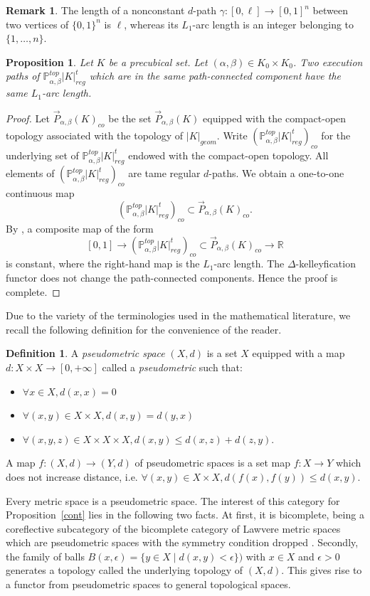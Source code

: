 \documentclass[a4paper,12pt]{amsart}
\newcommand{\p}{\times}
\renewcommand{\vec}{\overrightarrow}
\renewcommand{\P}{\mathbb{P}}
\newtheorem{prop}[thm]{Proposition}
\newcommand{\bp}{\begin{prop}}
\newcommand{\ep}{\end{prop}}
\newcommand{\bpf}{\begin{proof}}
\newcommand{\epf}{\end{proof}}
\theoremstyle{definition}
\newtheorem{defn}[thm]{Definition}
\newtheorem{rem}[thm]{Remark}
\newcommand{\bd}{\begin{defn}}
\newcommand{\ed}{\end{defn}}
\renewcommand{\leq}{\leqslant}
\renewcommand{\P}{\mathbb{P}}
\begin{document}
\begin{rem}
	The length of a nonconstant $d$-path $\gamma:[0,\ell]\to [0,1]^n$ between two vertices of $\{0,1\}^n$ is $\ell$, whereas its $L_1$-arc length is an integer belonging to $\{1,\dots,n\}$.
\end{rem} 

\bp \label{same-length}
Let $K$ be a precubical set. Let $(\alpha,\beta)\in K_0\p K_0$. Two execution paths of $\P^{top}_{\alpha,\beta}|K|^t_{reg}$ which are in the same path-connected component have the same $L_1$-arc length. 
\ep

\bpf
Let $\vec{P}_{\alpha,\beta}(K)_{co}$ be the set $\vec{P}_{\alpha,\beta}(K)$ equipped with the compact-open topology associated with the topology of $|K|_{geom}$. Write $(\P^{top}_{\alpha,\beta}|K|^t_{reg})_{co}$ for the underlying set of $\P^{top}_{\alpha,\beta}|K|^t_{reg}$ endowed with the compact-open topology. All elements of $(\P^{top}_{\alpha,\beta}|K|^t_{reg})_{co}$ are tame regular $d$-paths. We obtain a one-to-one continuous map \[(\P^{top}_{\alpha,\beta}|K|^t_{reg})_{co}\subset \vec{P}_{\alpha,\beta}(K)_{co}.\] By \cite[Proposition~2.2]{Raussen2012}, a composite map of the form \[[0,1]\longrightarrow (\P^{top}_{\alpha,\beta}|K|^t_{reg})_{co} \subset \vec{P}_{\alpha,\beta}(K)_{co} \longrightarrow \mathbb{R}\] is constant, where the right-hand map is the $L_1$-arc length. The $\Delta$-kelleyfication functor does not change the path-connected components. Hence the proof is complete. 
\epf


Due to the variety of the terminologies used in the mathematical literature, we recall the following definition for the convenience of the reader.

\bd
A \textit{pseudometric space} $(X,d)$ is a set $X$ equipped with a map $d:X\p X\to [0,+\infty]$ called a \textit{pseudometric} such that:
\begin{itemize}
	\item $\forall x\in X,d(x,x)=0$
	\item $\forall (x,y)\in X\p X, d(x,y)=d(y,x)$
	\item $\forall (x,y,z)\in X\p X\p X, d(x,y)\leq d(x,z)+d(z,y)$.
\end{itemize}
A map $f:(X,d)\to (Y,d)$ of pseudometric spaces is a set map $f:X\to Y$ which does not increase distance, i.e. $\forall (x,y)\in X\p X, d(f(x),f(y))\leq d(x,y)$.
\ed

Every metric space is a pseudometric space. The interest of this category for Proposition~\ref{cont} lies in the following two facts. At first, it is bicomplete, being a coreflective subcategory of the bicomplete category of Lawvere metric spaces which are pseudometric spaces with the symmetry condition dropped \cite{LawvereMetric}. Secondly, the family of balls $B(x,\epsilon)=\{y\in X\mid d(x,y)<\epsilon\})$ with $x\in X$ and $\epsilon>0$ generates a topology called the underlying topology of $(X,d)$. This gives rise to a functor from pseudometric spaces to general topological spaces.
\end{document}
